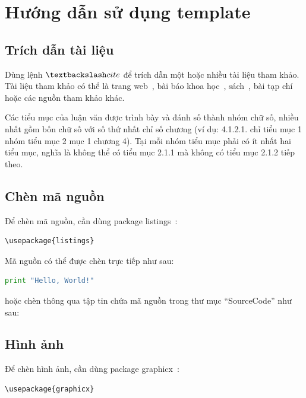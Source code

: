 \chapter{Hướng dẫn sử dụng template}
\label{Chapter3}

\section{Trích dẫn tài liệu}

Dùng lệnh $\textbackslash cite$ để trích dẫn một hoặc nhiều tài liệu tham khảo. Tài liệu tham khảo có thể là trang web~\cite{Listings,HDLVThS}, bài báo khoa học~\cite{1994-Cavnar}, sách~\cite{1984-TeX-Knuth,2006-DDien,2006-NPTV}, bài tạp chí~\cite{1989-TED} hoặc các nguồn tham khảo khác. 

Các tiểu mục của luận văn được trình bày và đánh số thành nhóm chữ số, nhiều nhất gồm bốn chữ số với số thứ nhất chỉ số chương (ví dụ: 4.1.2.1. chỉ tiểu mục 1 nhóm tiểu mục 2 mục 1 chương 4).
Tại mỗi nhóm tiểu mục phải có ít nhất hai tiểu mục, nghĩa là không thể có tiểu mục 2.1.1 mà không có tiểu mục 2.1.2 tiếp theo.

\section{Chèn mã nguồn}

Để chèn mã nguồn, cần dùng package listings~\cite{Listings}:

\begin{lstlisting}
\usepackage{listings}
\end{lstlisting}

Mã nguồn có thể được chèn trực tiếp như sau:

\begin{lstlisting}[language=Python]
print "Hello, World!"
\end{lstlisting}

hoặc chèn thông qua tập tin chứa mã nguồn trong thư mục ``SourceCode'' như sau:



\section{Hình ảnh}

Để chèn hình ảnh, cần dùng package graphicx~\cite{Figures}:

\begin{lstlisting}
\usepackage{graphicx}
\end{lstlisting}

